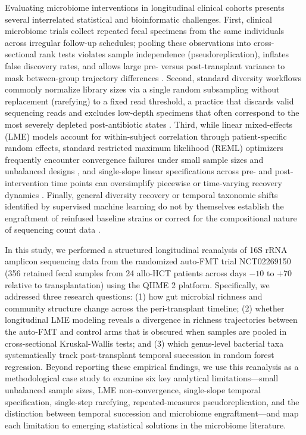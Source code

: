 Evaluating microbiome interventions in longitudinal clinical cohorts presents several interrelated statistical and bioinformatic challenges. First, clinical microbiome trials collect repeated fecal specimens from the same individuals across irregular follow-up schedules; pooling these observations into cross-sectional rank tests violates sample independence (pseudoreplication), inflates false discovery rates, and allows large pre- versus post-transplant variance to mask between-group trajectory differences \citep{herman2024assessingb,zhou2021linda,zhang2026bayesian}. Second, standard diversity workflows commonly normalize library sizes via a single random subsampling without replacement (rarefying) to a fixed read threshold, a practice that discards valid sequencing reads and excludes low-depth specimens that often correspond to the most severely depleted post-antibiotic states \citep{mcmurdie2013waste,raspet2024facilitating}. Third, while linear mixed-effects (LME) models account for within-subject correlation through patient-specific random effects, standard restricted maximum likelihood (REML) optimizers frequently encounter convergence failures under small sample sizes and unbalanced designs \citep{barrera2025stochastic}, and single-slope linear specifications across pre- and post-intervention time points can oversimplify piecewise or time-varying recovery dynamics \citep{fontaine2026locally}. Finally, general diversity recovery or temporal taxonomic shifts identified by supervised machine learning do not by themselves establish the engraftment of reinfused baseline strains \citep{herman2024assessing,herman2024assessingb} or correct for the compositional nature of sequencing count data \citep{zhou2021linda}.

In this study, we performed a structured longitudinal reanalysis of 16S rRNA amplicon sequencing data from the randomized auto-FMT trial NCT02269150 (356 retained fecal samples from 24 allo-HCT patients across days $-10$ to $+70$ relative to transplantation) using the QIIME 2 platform. Specifically, we addressed three research questions: (1) how gut microbial richness and community structure change across the peri-transplant timeline; (2) whether longitudinal LME modeling reveals a divergence in richness trajectories between the auto-FMT and control arms that is obscured when samples are pooled in cross-sectional Kruskal-Wallis tests; and (3) which genus-level bacterial taxa systematically track post-transplant temporal succession in random forest regression. Beyond reporting these empirical findings, we use this reanalysis as a methodological case study to examine six key analytical limitations---small unbalanced sample sizes, LME non-convergence, single-slope temporal specification, single-step rarefying, repeated-measures pseudoreplication, and the distinction between temporal succession and microbiome engraftment---and map each limitation to emerging statistical solutions in the microbiome literature.
